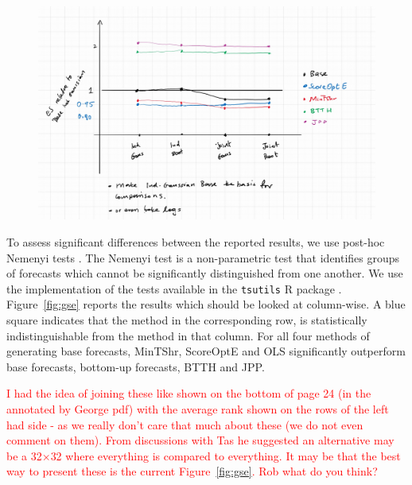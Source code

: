 \documentclass[11pt]{article}
\theoremstyle{definition}
\begin{document}
\begin{figure}[H]
	\centering
	\includegraphics[width=.85\textwidth]{Figs/ForEval_Sim1.jpg}
	\caption{}
	\label{fig:ES1}
\end{figure}

To assess significant differences between the reported results, we use post-hoc Nemenyi tests \citep{HolEtAl2013}. The Nemenyi test is a non-parametric test that identifies groups of forecasts which cannot be significantly distinguished from one another. We use the implementation of the tests available in the \verb|tsutils| R package \citep{tsutilspackage}. Figure~\ref{fig:gse} reports the results which should be looked at column-wise. A blue square indicates that the method in the corresponding row, is statistically indistinguishable from the method in that column. For all four methods of generating base forecasts, MinTShr, ScoreOptE and OLS significantly outperform base forecasts, bottom-up forecasts, BTTH and JPP.

\textcolor{red}{I had the idea of joining these like shown on the bottom of page 24 (in the annotated by George pdf) with the average rank shown on the rows of the left had side - as we really don't care that much about these (we do not even comment on them). From discussions with Tas he suggested an alternative may be a 32$\times$32 where everything is compared to everything. It may be that the best way to present these is the current Figure~\ref{fig:gse}. Rob what do you think?}
\end{document}

